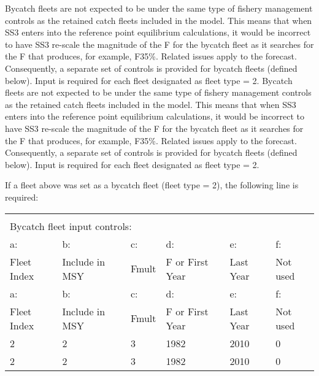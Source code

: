 Bycatch fleets are not expected to be under the same type of fishery management controls as the retained catch fleets included in the model. This means that when SS3 enters into the reference point equilibrium calculations, it would be incorrect to have SS3 re-scale the magnitude of the F for the bycatch fleet as it searches for the F that produces, for example, F35\%. Related issues apply to the forecast. Consequently, a separate set of controls is provided for bycatch fleets (defined below). Input is required for each fleet designated as fleet type = 2.
Bycatch fleets are not expected to be under the same type of fishery management controls as the retained catch fleets included in the model. This means that when SS3 enters into the reference point equilibrium calculations, it would be incorrect to have SS3 re-scale the magnitude of the F for the bycatch fleet as it searches for the F that produces, for example, F35\%. Related issues apply to the forecast. Consequently, a separate set of controls is provided for bycatch fleets (defined below). Input is required for each fleet designated as fleet type = 2.

\noindent If a fleet above was set as a bycatch fleet (fleet type = 2), the following line is required: 
\begin{center}
	\vspace*{-\baselineskip}
	\begin{tabular}{p{2.25cm} p{2.65cm} p{2.25cm} p{2.5cm} p{2.5cm} p{2cm}}
	\vspace*{-\baselineskip}
	\begin{tabular}{p{2.25cm} p{2.65cm} p{2.25cm} p{2.5cm} p{2.5cm} p{2cm}}

		\multicolumn{6}{l}{Bycatch fleet input controls:} \\
		\multicolumn{6}{l}{Bycatch fleet input controls:} \\
		\hline
		a: 			  & b:  			 & c:    & d:              & e:        & f: \Tstrut\\
		Fleet Index   & Include in MSY   & Fmult & F or First Year & Last Year & Not used \Bstrut\\			
		a: 			  & b:  			 & c:    & d:              & e:        & f: \Tstrut\\
		Fleet Index   & Include in MSY   & Fmult & F or First Year & Last Year & Not used \Bstrut\\			
		\hline
		2 & 2 & 3 & 1982 & 2010 & 0 \Tstrut\Bstrut\\
		2 & 2 & 3 & 1982 & 2010 & 0 \Tstrut\Bstrut\\
		\hline		
	\end{tabular}
\end{center}

